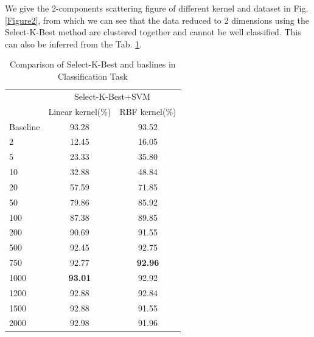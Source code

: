 \documentclass{article}
\begin{document}
We give the 2-components scattering figure of different kernel and dataset in Fig. \ref{Figure2}, from which we can see that the data reduced to 2 dimensions using the Select-K-Best method are clustered together and cannot be well classified. This can also be inferred from the Tab. \ref{base1}.

\begin{table}[htbp]
	\centering
	\newcommand{\tabincell}[2]{\begin{tabular}{@{}#1@{}}#2\end{tabular}}
	\renewcommand\arraystretch{1.0}
	\caption{Comparison of Select-K-Best and baslines in Classification Task}
	\label{base1}%
	\begin{tabular}{@{}p{2.5cm}<{\centering}|c|c}
		\hline
		\multirow{2}{*}{\diagbox[height=2\line,width=2.7cm,font=\tiny,trim=lr]{$d$}{Acc.}{$\mathit{M}$}} &\multicolumn{2}{c}{Select-K-Best+SVM}\\
		\cline{2-3}
			& {Linear kernel(\%)} & {RBF kernel(\%)}\\
		\cline{2-3}
		\hline
		Baseline & 93.28 & 93.52\\
		\hline
		2   & 12.45 & 16.05\\
		\hline
		5   & 23.33 & 35.80\\
		\hline
		10  & 32.88 & 48.84\\
		\hline
		20  & 57.59 & 71.85\\
		\hline
		50  & 79.86 & 85.92\\
		\hline
		100 & 87.38 & 89.85\\
		\hline
		200 & 90.69 & 91.55\\
		\hline
		500 & 92.45 & 92.75\\
		\hline
		750 & 92.77 & \textbf{92.96}\\
		\hline
		1000 & \textbf{93.01} & 92.92\\
		\hline
		1200 & 92.88 & 92.84\\
		\hline
		1500 & 92.88 & 91.55\\
		\hline
		2000 & 92.98 & 91.96\\
		\hline
\end{tabular}
\end{table}
\end{document}
